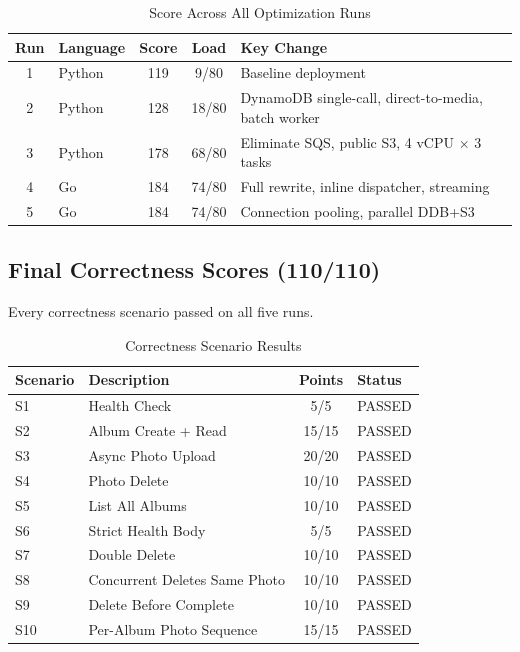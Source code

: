 \documentclass[11pt]{article}
\begin{document}
\begin{table}[H]
\centering
\caption{Score Across All Optimization Runs}
\begin{tabular}{clccl}
\toprule
\textbf{Run} & \textbf{Language} & \textbf{Score} & \textbf{Load} & \textbf{Key Change} \\
\midrule
1 & Python & 119 & 9/80 & Baseline deployment \\
2 & Python & 128 & 18/80 & DynamoDB single-call, direct-to-media, batch worker \\
3 & Python & 178 & 68/80 & Eliminate SQS, public S3, 4 vCPU $\times$ 3 tasks \\
4 & Go & 184 & 74/80 & Full rewrite, inline dispatcher, streaming \\
5 & Go & 184 & 74/80 & Connection pooling, parallel DDB+S3 \\
\bottomrule
\end{tabular}
\end{table}

\subsection{Final Correctness Scores (110/110)}

Every correctness scenario passed on all five runs.

\begin{table}[H]
\centering
\caption{Correctness Scenario Results}
\begin{tabular}{llcl}
\toprule
\textbf{Scenario} & \textbf{Description} & \textbf{Points} & \textbf{Status} \\
\midrule
S1 & Health Check & 5/5 & PASSED \\
S2 & Album Create + Read & 15/15 & PASSED \\
S3 & Async Photo Upload & 20/20 & PASSED \\
S4 & Photo Delete & 10/10 & PASSED \\
S5 & List All Albums & 10/10 & PASSED \\
S6 & Strict Health Body & 5/5 & PASSED \\
S7 & Double Delete & 10/10 & PASSED \\
S8 & Concurrent Deletes Same Photo & 10/10 & PASSED \\
S9 & Delete Before Complete & 10/10 & PASSED \\
S10 & Per-Album Photo Sequence & 15/15 & PASSED \\
\bottomrule
\end{tabular}
\end{table}
\end{document}
